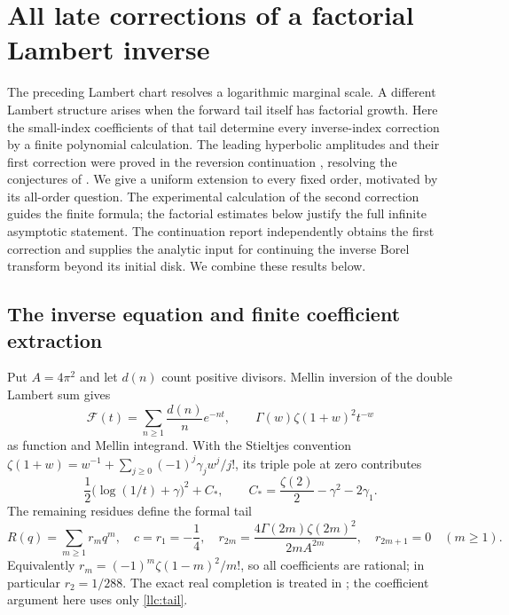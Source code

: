 \section{All late corrections of a factorial Lambert inverse}
\label{llc:section}

The preceding Lambert chart resolves a logarithmic marginal scale. A
different Lambert structure arises when the forward tail itself has
factorial growth. Here the small-index coefficients of that tail determine
every inverse-index correction by a finite polynomial calculation.
The leading hyperbolic amplitudes and their first correction were proved
in the reversion continuation \cite{llc:reversion}, resolving the
conjectures of \cite{llc:inverse}. We give a uniform extension to every
fixed order, motivated by its all-order question. The experimental
calculation of the second correction guides the finite formula; the
factorial estimates below justify the full infinite asymptotic statement.
The continuation report \cite{llc:continuation} independently obtains the
first correction and supplies the analytic input for continuing the inverse
Borel transform beyond its initial disk. We combine these results below.

\subsection{The inverse equation and finite coefficient extraction}

Put $A=4\pi^2$ and let $d(n)$ count positive divisors. Mellin inversion
of the double Lambert sum gives
\[
 \mathcal F(t)=\sum_{n\ge1}\frac{d(n)}n e^{-nt},\qquad
 \Gamma(w)\zeta(1+w)^2t^{-w}
\]
as function and Mellin integrand. With the Stieltjes convention
$\zeta(1+w)=w^{-1}+\sum_{j\ge0}(-1)^j\gamma_jw^j/j!$, its
triple pole at zero contributes
\[
 \frac12\bigl(\log(1/t)+\gamma\bigr)^2+C_* ,\qquad
 C_* =\frac{\zeta(2)}2-\gamma^2-2\gamma_1.
\]
The remaining residues define the formal tail
\begin{equation}\label{llc:tail}
 R(q)=\sum_{m\ge1}r_mq^m,\quad c=r_1=-\frac14,\quad
 r_{2m}=\frac{4\Gamma(2m)\zeta(2m)^2}{2mA^{2m}},\quad
 r_{2m+1}=0\quad(m\ge1).
\end{equation}
Equivalently $r_m=(-1)^m\zeta(1-m)^2/m!$, so all coefficients
are rational; in particular $r_2=1/288$. The exact real completion
is treated in \cite{llc:inverse}; the coefficient argument here uses
only \eqref{llc:tail}.

